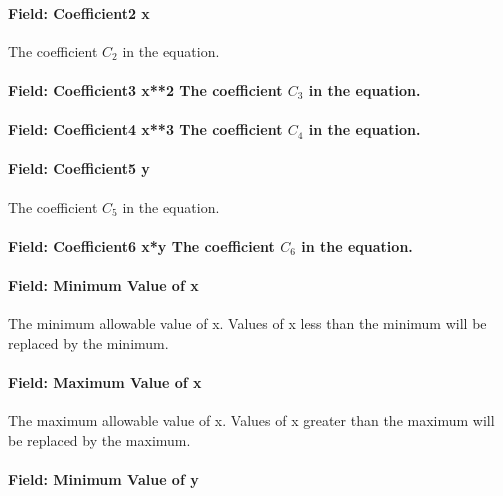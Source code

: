 \paragraph{Field: Coefficient2 x}\label{field-coefficient2-x-6}

The coefficient \(C_2\) in the equation.

\paragraph{Field: Coefficient3 x**2 The coefficient \(C_3\) in the equation.}\label{field-coefficient3-x2-the-coefficient-cux5f3-in-the-equation.}

\paragraph{Field: Coefficient4 x**3 The coefficient \(C_4\) in the equation.}\label{field-coefficient4-x3-the-coefficient-cux5f4-in-the-equation.}

\paragraph{Field: Coefficient5 y}\label{field-coefficient5-y}

The coefficient \(C_5\) in the equation.

\paragraph{Field: Coefficient6 x*y The coefficient \(C_6\) in the equation.}\label{field-coefficient6-xy-the-coefficient-cux5f6-in-the-equation.}

\paragraph{Field: Minimum Value of x}\label{field-minimum-value-of-x-8}

The minimum allowable value of x. Values of x less than the minimum will be replaced by the minimum.

\paragraph{Field: Maximum Value of x}\label{field-maximum-value-of-x-9}

The maximum allowable value of x. Values of x greater than the maximum will be replaced by the maximum.

\paragraph{Field: Minimum Value of y}\label{field-minimum-value-of-y-3}

